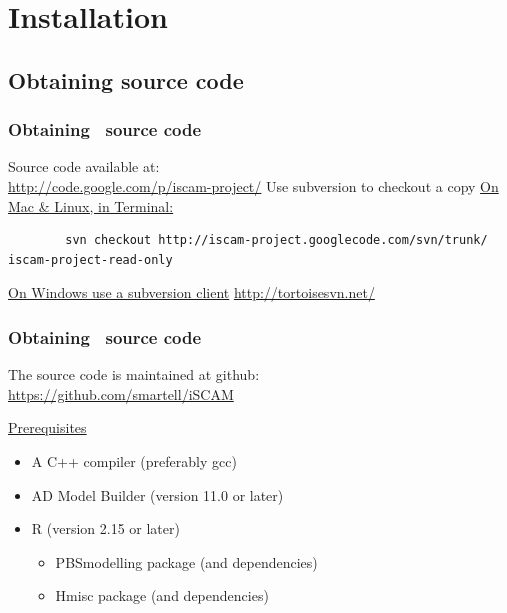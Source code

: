 \section{Installation} %
\label{sec:installation}


\subsection[Source code]{Obtaining source code} %
\label{sub:obtaining_source_code}

\begin{frame}[containsverbatim]
	\frametitle{Obtaining \iscam\ source code}
	Source code available at:\\
	\url{http://code.google.com/p/iscam-project/}
	\vfill
	Use subversion to checkout a copy
	\vfill
	\underline{On Mac \& Linux, in Terminal:}
	\tiny
	\begin{verbatim}
		svn checkout http://iscam-project.googlecode.com/svn/trunk/			iscam-project-read-only
	\end{verbatim}
	\normalsize
	\vfill
	\underline{On Windows use a subversion client}
	\url{http://tortoisesvn.net/}
\end{frame}

\begin{frame}[containsverbatim]
	\frametitle{Obtaining \iscam\ source code}
	The source code is maintained at github:\\
	\url{https://github.com/smartell/iSCAM}
	
	\underline{Prerequisites}
	\begin{itemize}
		\item A C++ compiler (preferably gcc)
		\item AD Model Builder (version 11.0 or later)
		\item R (version 2.15 or later)
		\begin{itemize}
			\item PBSmodelling package (and dependencies)
			\item Hmisc package (and dependencies)
		\end{itemize}
	\end{itemize}

\end{frame}


